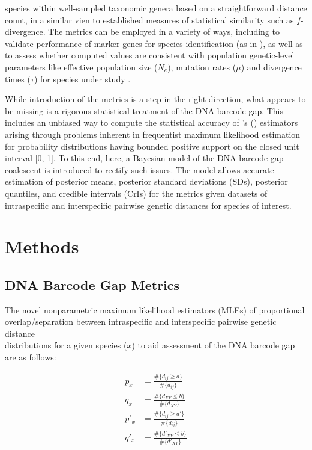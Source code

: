 \documentclass[12pt]{article}
\begin{document}
species within well-sampled taxonomic genera based on a straightforward distance count, in a similar vien to established measures of statistical similarity such as $f$-divergence. The metrics can be employed in a variety of ways, including to validate performance of marker genes for species identification (as in \citet{phillips2024measure}), as well as to assess whether computed values are consistent with population genetic-level parameters like effective population size ($N_e$), mutation rates ($\mu$) and divergence times ($\tau$) for species under study \citep{mather2019practical}. 

While introduction of the metrics is a step in the right direction, what appears to be missing is a rigorous statistical treatment of the DNA barcode gap. This includes an unbiased way to compute the statistical accuracy of \citeauthor{phillips2024measure}'s (\citeyear{phillips2024measure}) estimators arising through problems inherent in frequentist maximum likelihood estimation for probability distributions having bounded positive support on the closed unit interval [0, 1]. To this end, here, a Bayesian model of the DNA barcode gap coalescent is introduced to rectify such issues. The model allows accurate estimation of posterior means, posterior standard deviations (SDs), posterior quantiles, and credible intervals (CrIs) for the metrics given datasets of intraspecific and interspecific pairwise genetic distances for species of interest.

\section{Methods}

\subsection{DNA Barcode Gap Metrics}

The novel nonparametric maximum likelihood estimators (MLEs) of proportional \\ overlap/separation between intraspecific and interspecific pairwise genetic distance \\ distributions for a given species ($x$) to aid assessment of the DNA barcode gap are as follows:

\begin{align}
p_x &= \frac{\#\{d_{ij} \geq a\}}{\#\{d_{ij}\}} \\[1mm]
q_x &= \frac{\#\{d_{XY} \leq b\}}{\#\{d_{XY}\}} \\[1mm]
p'_x &= \frac{\#\{d_{ij} \geq a'\}}{\#\{d_{ij}\}} \\[1mm]
q'_x &= \frac{\#\{d'_{XY} \leq b\}}{\#\{d'_{XY}\}}
\end{align}
\end{document}
